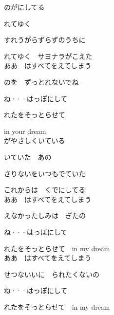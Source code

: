 \large{

のがにしてる

れてゆく

すれうがらずらずのうちに

れてゆく　サヨナラがこえた
\\

ああ　はすべてをえてしまう

のを　ずっとれないでね

ね···はっぽにして

れたをそっとらせて

in your dream
\\

がやさしくいている

いていた　あの

さりないをいつもでていた

これからは　くでにしてる
\\

ああ　はすべてをえてしまう

えなかったしみは　ぎたの

ね···はっぽにして

れたをそっとらせて　in my dream
\\

ああ　はすべてをえてしまう

せつないいに　られたくないの

ね···はっぽにして

れたをそっとらせて　in my dream

}